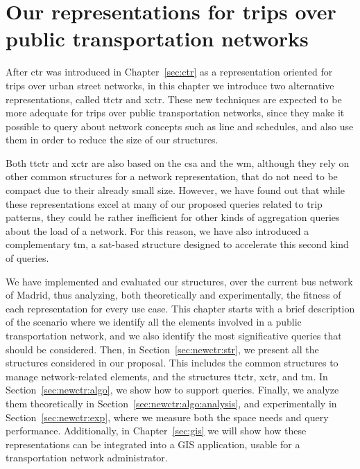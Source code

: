 \chapter{Our representations for trips over public transportation networks}
\label{sec:newctr}

	After \gls{ctr} was introduced in Chapter~\ref{sec:ctr} as a representation oriented for trips over urban street networks, in this chapter we introduce two alternative representations, called \acrfull{ttctr} and \acrfull{xctr}. These new techniques are expected to be more adequate for trips over public transportation networks, since they make it possible to query about network concepts such as line and schedules, and also use them in order to reduce the size of our structures.
	
	Both \gls{ttctr} and \gls{xctr} are also based on the \gls{csa}  and the \gls{wm}, although they rely on other common structures for a network representation, that do not need to be compact due to their already small size. However, we have found out that while these representations excel at many of our proposed queries related to trip patterns, they could be rather inefficient for other kinds of aggregation queries about the load of a network. For this reason, we have also introduced a complementary \acrfull{tm}, a \gls{sat}-based structure designed to accelerate this second kind of queries.
	
	We have implemented and evaluated our structures, over the current bus network of Madrid, thus analyzing, both theoretically and experimentally, the fitness of each representation for every use case. This chapter starts with a brief description of the scenario where we identify all the elements involved in a public transportation network, and we also identify the most significative queries that should be considered. Then, in Section~\ref{sec:newctr:str}, we present all the structures considered in our proposal. This includes the common structures to manage \mbox{network-related} elements, and the structures \gls{ttctr}, \gls{xctr}, and \gls{tm}. In Section~\ref{sec:newctr:algo}, we show how to support queries. Finally, we analyze them theoretically in Section~\ref{sec:newctr:algo:analysis}, and experimentally in Section~\ref{sec:newctr:exp}, where we measure both the space needs and query performance. Additionally, in Chapter~\ref{sec:gis} we will show how these representations can be integrated into a GIS application, usable for a transportation network administrator.
	
